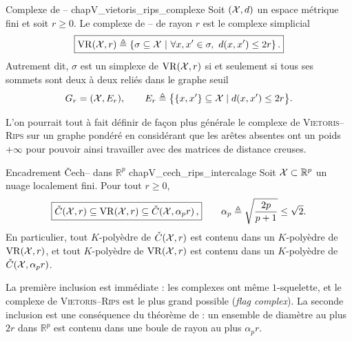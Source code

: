 \begin{Definition}{Complexe de -- \cite{Munkres, BoissonnatChazalYvinec}}{chapV_vietoris_rips_complexe}
Soit $(\mathcal{X},d)$ un espace métrique fini et soit $r\ge0$. Le complexe de -- de rayon $r$ est le complexe simplicial
\[
\boxed{
    \mathrm{VR}(\mathcal{X},r)
    \triangleq
    \left\{
        \sigma\subseteq \mathcal{X}
        \ \middle|\
        \forall x,x'\in\sigma,\ d(x,x')\le 2r
    \right\}.
    }
\]
Autrement dit, $\sigma$ est un simplexe de $\mathrm{VR}(\mathcal{X},r)$ si et seulement si tous ses sommets sont deux à deux reliés dans le graphe seuil
\[
    G_r=(\mathcal{X},E_r),
    \qquad
    E_r\triangleq
    \bigl\{\{x,x'\}\subseteq\mathcal{X}\mid d(x,x')\le 2r\bigr\}.
\]
\end{Definition}

L'on pourrait tout à fait définir de façon plus générale le complexe de \textsc{Vietoris--Rips} sur un graphe pondéré en considérant que les arêtes absentes ont un poids $+\infty$ pour pouvoir ainsi travailler avec des matrices de distance creuses.


\begin{Resultat}{Encadrement \v Cech-- dans $\mathbb R^p$ \cite{BoissonnatChazalYvinec}}{chapV_cech_rips_intercalage}
Soit $\mathcal{X}\subset\mathbb R^p$ un nuage localement fini. Pour tout $r\ge0$,
\[
\boxed{
    \check C(\mathcal{X},r)
    \subseteq
    \mathrm{VR}(\mathcal{X},r)
    \subseteq
    \check C\!\left(\mathcal{X},\alpha_p r\right),}
    \qquad
    \alpha_p\triangleq \sqrt{\frac{2p}{p+1}}\le\sqrt2.
\]
En particulier, tout $K$-polyèdre de $\check C(\mathcal{X},r)$ est contenu dans un $K$-polyèdre de $\mathrm{VR}(\mathcal{X},r)$, et tout $K$-polyèdre de $\mathrm{VR}(\mathcal{X},r)$ est contenu dans un $K$-polyèdre de $\check C(\mathcal{X},\alpha_p r)$.
\end{Resultat}
\begin{preuve}
La première inclusion est immédiate : les complexes ont même $1$-squelette, et le complexe de \textsc{Vietoris--Rips} est le plus grand possible (\emph{flag complex}). La seconde inclusion est une conséquence du théorème de  \cite{jung1901kleinste} : un ensemble de diamètre au plus $2r$ dans $\mathbb R^p$ est contenu dans une boule de rayon au plus $\alpha_p r$.
\end{preuve}


